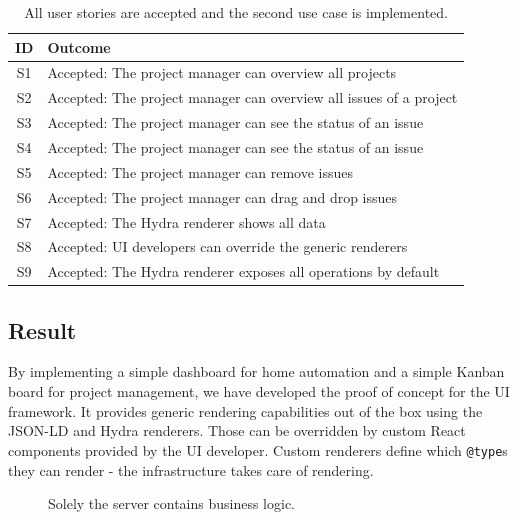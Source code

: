 \begin{table}[!htb]
  \begin{center}
    \begin{tabular}{ |c|l| }
      \hline
      \textbf{ID} & \textbf{Outcome} \\
      \hline
      S1 & Accepted: The project manager can overview all projects \\
      \hline
      S2 & Accepted: The project manager can overview all issues of a project \\
      \hline
      S3 & Accepted: The project manager can see the status of an issue \\
      \hline
      S4 & Accepted: The project manager can see the status of an issue \\
      \hline
      S5 & Accepted: The project manager can remove issues \\
      \hline
      S6 & Accepted: The project manager can drag and drop issues \\
      \hline
      S7 & Accepted: The Hydra renderer shows all data \\
      \hline
      S8 & Accepted: UI developers can override the generic renderers \\
      \hline
      S9 & Accepted: The Hydra renderer exposes all operations by default \\
      \hline
    \end{tabular}
    \caption{All user stories are accepted and the second use case is implemented.}
  \end{center}
\end{table}

\subsection{Result}
By implementing a simple dashboard for home automation and a simple Kanban board for project management, we have developed the proof of concept for the UI framework. It provides generic rendering capabilities out of the box using the JSON-LD and Hydra renderers. Those can be overridden by custom React components provided by the UI developer. Custom renderers define which \lstinline{@type}s they can render - the infrastructure takes care of rendering.

\begin{figure}[!htb]
  \caption{Solely the server contains business logic.}
  \label{fig:businesslogic}
\end{figure}


